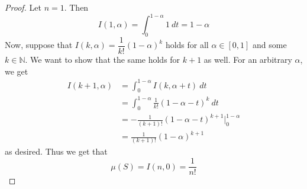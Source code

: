 \documentclass{article}
\theoremstyle{plain} %
\numberwithin{thm}{section} %
\theoremstyle{definition}
\begin{document}
\begin{proof}
            Let \(n = 1\). Then
            \[
                I(1, \alpha) = \int _0^{1- \alpha}1\ dt = 1 - \alpha
            \]
            Now, suppose that \(I(k, \alpha) = \dfrac{1}{k!}(1 - \alpha)^k\) holds for all \(\alpha \in [0,1]\) and some \(k \in \mathbb{N}\). We want to show that the same holds for \(k + 1\) as well. For an arbitrary \(\alpha\), we get
            \begin{align*}
                I(k+1, \alpha ) &= \int _0^{1 - \alpha} I(k, \alpha + t)\ dt \\
                &= \int _0^{1-\alpha} \frac{1}{k!}(1 - \alpha - t)^k\ dt \\
                &= -\frac{1}{(k+1)!}(1 - \alpha - t)^{k+1} \Big| _0^{1-\alpha} \\
                &= \frac{1}{(k+1)!}(1 - \alpha)^{k+1}
            \end{align*}
            as desired. Thus we get that
            \[
                \mu (S) = I(n, 0) = \frac{1}{n!}
            \]    
        \end{proof}
        \newpage
\end{document}
